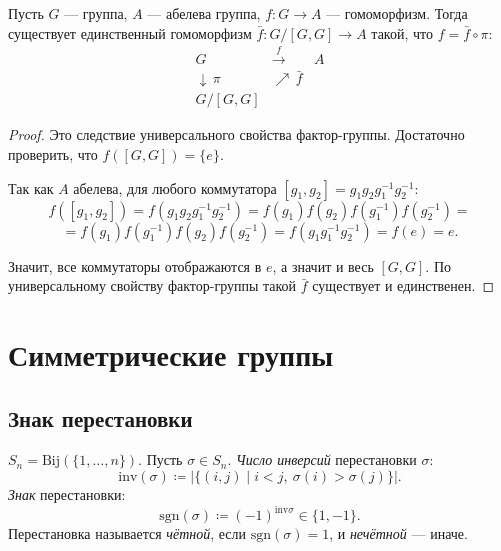 \begin{stmt}
    Пусть $G$ --- группа, $A$ --- абелева группа, $f\colon G \to A$ --- гомоморфизм.
    Тогда существует единственный гомоморфизм $\bar{f}\colon G/[G,G] \to A$ такой, что $f = \bar{f} \circ \pi$:
    \[
        \begin{array}{ccc}
            G & \xrightarrow{\ f\ } & A \\
            \downarrow\, \pi & \nearrow\, \bar{f} & \\
            G/[G,G] & &
        \end{array}
    \]

    \begin{proof}
        Это следствие универсального свойства фактор-группы. Достаточно проверить, что $f([G,G]) = \{e\}$.

        Так как $A$ абелева, для любого коммутатора $[g_1, g_2] = g_1 g_2 g_1^{-1} g_2^{-1}$:
        \[
            f([g_1, g_2]) = f(g_1 g_2 g_1^{-1} g_2^{-1}) = f(g_1) f(g_2) f(g_1^{-1}) f(g_2^{-1}) = 
        \]
        \[
            = f(g_1) f(g_1^{-1}) f(g_2) f(g_2^{-1}) = f(g_1 g_1^{-1} g_2^{-1}) = f(e) = e.
        \]

        Значит, все коммутаторы отображаются в $e$, а значит и весь $[G,G]$. 
        По универсальному свойству фактор-группы такой $\bar{f}$ существует и единственен.
    \end{proof}
\end{stmt}


\section{Симметрические группы}
 
\subsection*{Знак перестановки}
 
\begin{definition}
    $S_n = \mathrm{Bij}(\{1, \ldots, n\}).$
    Пусть $\sigma \in S_n$. \emph{Число инверсий} перестановки $\sigma$:
    \[
        \mathrm{inv}(\sigma) \coloneqq \bigl|\{(i,j) \mid i < j,\ \sigma(i) > \sigma(j)\}\bigr|.
    \]
    \emph{Знак} перестановки:
    \[
        \mathrm{sgn}(\sigma) \coloneqq (-1)^{\mathrm{inv}{\sigma}} \in \{1, -1\}.
    \]
    Перестановка называется \emph{чётной}, если $\mathrm{sgn}(\sigma) = 1$, и \emph{нечётной} --- иначе.
\end{definition}

